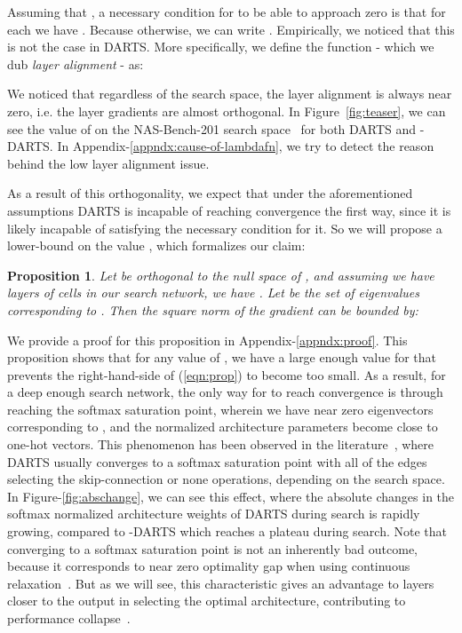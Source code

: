 \documentclass{article} \usepackage{fancyhdr, iclr2023_conference, times}
\newcommand{\mydarts}{-DARTS\xspace}
\newtheorem{prop}{Proposition}
\newcommand{\lambdafn}{layer alignment\xspace}
\begin{document}
Assuming that , a necessary condition for  to be able to approach zero is that for each  we have . Because otherwise, we can write . Empirically, we noticed that this is not the case in DARTS. More specifically, we define the function  - which we dub \textit{\lambdafn} - as:

We noticed that regardless of the search space, the \lambdafn is always near zero, i.e. the layer gradients are almost orthogonal. In Figure~\ref{fig:teaser}, we can see the value of  on the NAS-Bench-201 search space~\citep{DBLP:conf/iclr/Dong020} for both DARTS and \mydarts. In Appendix-\ref{appndx:cause-of-lambdafn}, we try to detect the reason behind the low layer alignment issue.
\par As a result of this orthogonality, we expect that under the aforementioned assumptions DARTS is incapable of reaching convergence the first way, since it is likely incapable of satisfying the necessary condition for it. So we will propose a lower-bound on the value , which formalizes our claim:
\begin{prop}
\label{prop:1}
Let  be orthogonal to the null space of , and assuming we have  layers of cells in our search network, we have . Let  be the set of eigenvalues corresponding to . Then the square norm of the gradient  can be bounded by:

\end{prop}
We provide a proof for this proposition in Appendix-\ref{appndx:proof}. This proposition shows that for any value of , we have a large enough value for  that prevents the right-hand-side of (\ref{eqn:prop}) to become too small. As a result, for a deep enough search network, the only way for  to reach convergence is through reaching the softmax saturation point, wherein we have near zero eigenvectors corresponding to , and the normalized architecture parameters become close to one-hot vectors. This phenomenon has been observed in the literature~\citep{DBLP:journals/corr/abs-1910-11831, DBLP:conf/iclr/Dong020}, where DARTS usually converges to a softmax saturation point with all of the edges selecting the skip-connection or none operations, depending on the search space. In Figure-\ref{fig:abschange}, we can see this effect, where the absolute changes in the softmax normalized architecture weights of DARTS during search is rapidly growing, compared to \mydarts which reaches a plateau during search. Note that converging to a softmax saturation point is not an inherently bad outcome, because it corresponds to near zero optimality gap when using continuous relaxation~\citep{DBLP:books/cu/BV2014}. But as we will see, this characteristic gives an advantage to layers closer to the output in selecting the optimal architecture, contributing to performance collapse~\citep{DBLP:conf/iclr/ZelaESMBH20}.
\end{document}

